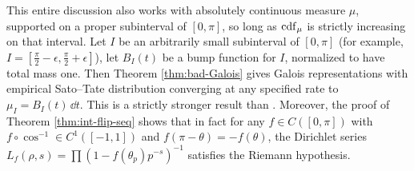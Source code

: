 This entire discussion also works with absolutely continuous measure $\mu$, 
supported on a proper subinterval of $[0,\pi]$, so long as $\operatorname{cdf}_\mu$ is 
strictly increasing on that interval. Let $I$ be an arbitrarily small 
subinterval of $[0,\pi]$ (for example, 
$I = \left[\frac \pi 2 - \epsilon,\frac \pi 2 + \epsilon\right]$), let $B_I(t)$ 
be a bump function for $I$, normalized to have total mass one. Then Theorem 
\ref{thm:bad-Galois} gives Galois representations with empirical Sato--Tate 
distribution converging at any specified rate to $\mu_I = B_I(t)\, \dd t$. This 
is a strictly stronger result than \cite[Th.~5.2]{pande-2011}. Moreover, the 
proof of Theorem \ref{thm:int-flip-seq} shows that in fact for any 
$f\in C([0,\pi])$ with $f\circ \cos^{-1}\in C^1([-1,1])$ and 
$f(\pi-\theta) = -f(\theta)$, the Dirichlet series 
$L_f(\rho,s) = \prod \left( 1 - f(\theta_p) p^{-s}\right)^{-1}$ satisfies the 
Riemann hypothesis. 

